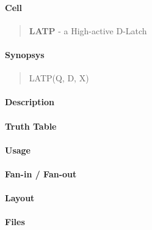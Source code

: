 \label{LATP}
\paragraph{Cell}
\begin{quote}
    \textbf{LATP} - a High-active D-Latch
\end{quote}

\paragraph{Synopsys}
\begin{quote}
    LATP(Q, D, X)
\end{quote}

\paragraph{Description}

%

\paragraph{Truth Table}
%

\paragraph{Usage}

\paragraph{Fan-in / Fan-out}

\paragraph{Layout}

\paragraph{Files}
